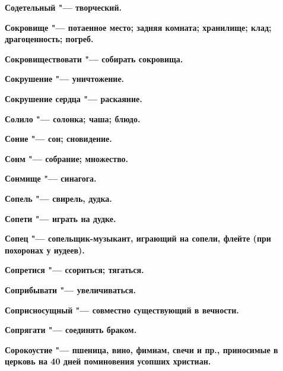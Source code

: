 \bfseries Содетельный \normalfont{} "--- творческий. 




\bfseries Сокровище \normalfont{} "--- потаенное место; задняя комната; хранилище; клад; драгоценность; погреб. 




\bfseries Сокровиществовати \normalfont{} "--- собирать сокровища. 




\bfseries Сокрушение \normalfont{} "--- уничтожение. 




\bfseries Сокрушение сердца \normalfont{} "--- раскаяние. 




\bfseries Солило \normalfont{} "--- солонка; чаша; блюдо. 




\bfseries Соние \normalfont{} "--- сон; сновидение. 




\bfseries Сонм \normalfont{} "--- собрание; множество. 




\bfseries Сонмище \normalfont{} "--- синагога. 




\bfseries Сопель \normalfont{} "--- свирель, дудка. 




\bfseries Сопети \normalfont{} "--- играть на дудке. 




\bfseries Сопец \normalfont{} "--- сопельщик-музыкант, играющий на сопели, флейте (при похоронах у иудеев). 




\bfseries Сопретися \normalfont{} "--- ссориться; тягаться. 




\bfseries Соприбывати \normalfont{} "--- увеличиваться. 




\bfseries Соприсносущный \normalfont{} "--- совместно существующий в вечности. 




\bfseries Сопрягати \normalfont{} "--- соединять браком. 




\bfseries Сорокоустие \normalfont{} "--- пшеница, вино, фимиам, свечи и пр., приносимые в церковь на 40 дней поминовения усопших христиан. 




